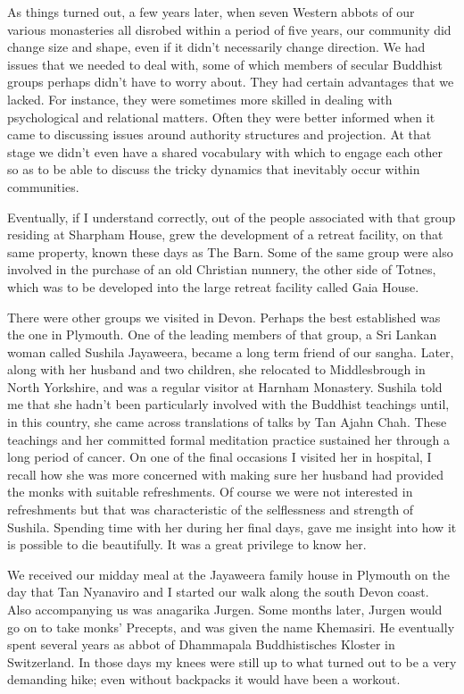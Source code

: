 As things turned out, a few years later, when seven Western abbots of
our various monasteries all disrobed within a period of five years, our
community did change size and shape, even if it didn't necessarily
change direction. We had issues that we needed to deal with, some of
which members of secular Buddhist groups perhaps didn't have to worry
about. They had certain advantages that we lacked. For instance, they
were sometimes more skilled in dealing with psychological and relational
matters. Often they were better informed when it came to discussing
issues around authority structures and projection. At that stage we
didn't even have a shared vocabulary with which to engage each other so
as to be able to discuss the tricky dynamics that inevitably occur
within communities.

Eventually, if I understand correctly, out of the people associated with
that group residing at Sharpham House, grew the development of a retreat
facility, on that same property, known these days as The Barn\cite{barn}.
Some of the same group were also involved in the
purchase of an old Christian nunnery, the other side of Totnes, which
was to be developed into the large retreat facility called Gaia House\cite{gaia}.

There were other groups we visited in Devon. Perhaps the best
established was the one in Plymouth. One of the leading members of that
group, a Sri Lankan woman called Sushila Jayaweera, became a long term
friend of our sangha. Later, along with her husband and two children,
she relocated to Middlesbrough in North Yorkshire, and was a regular
visitor at Harnham Monastery. Sushila told me that she hadn't been
particularly involved with the Buddhist teachings until, in this
country, she came across translations of talks by Tan Ajahn Chah. These
teachings and her committed formal meditation practice sustained her
through a long period of cancer. On one of the final occasions I visited
her in hospital, I recall how she was more concerned with making sure
her husband had provided the monks with suitable refreshments. Of course
we were not interested in refreshments but that was characteristic of
the selflessness and strength of Sushila. Spending time with her during
her final days, gave me insight into how it is possible to die
beautifully. It was a great privilege to know her.

We received our midday meal at the Jayaweera family house in Plymouth on
the day that Tan Nyanaviro and I started our walk along the south Devon
coast. Also accompanying us was anagarika Jurgen. Some months later,
Jurgen would go on to take monks' Precepts, and was given the name
Khemasiri. He eventually spent several years as abbot of
Dhammapala Buddhistisches Kloster\cite{dhammapala}
in Switzerland. In those days my knees were still up
to what turned out to be a very demanding hike; even without backpacks
it would have been a workout.

